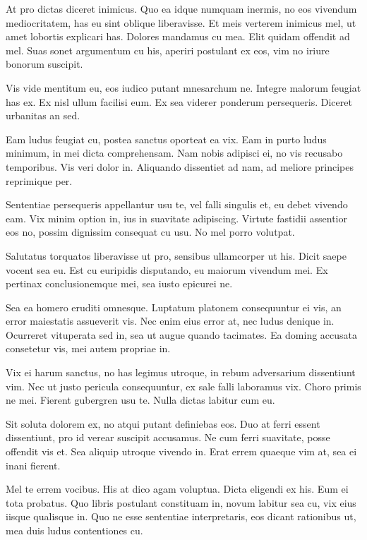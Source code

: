 \documentclass[twocolumn,twoside]{IEEEtran}
\begin{document}
 At pro dictas diceret inimicus. Quo ea idque numquam inermis, no eos vivendum
 mediocritatem, has eu sint oblique liberavisse. Et meis verterem inimicus mel,
 ut amet lobortis explicari has. Dolores mandamus cu mea. Elit quidam offendit
 ad mel. Suas sonet argumentum cu his, aperiri postulant ex eos, vim no iriure
 bonorum suscipit.

 Vis vide mentitum eu, eos iudico putant mnesarchum ne. Integre malorum feugiat
 has ex. Ex nisl ullum facilisi eum. Ex sea viderer ponderum persequeris.
 Diceret urbanitas an sed.

 Eam ludus feugiat cu, postea sanctus oporteat ea vix. Eam in purto ludus
 minimum, in mei dicta comprehensam. Nam nobis adipisci ei, no vis recusabo
 temporibus. Vis veri dolor in. Aliquando dissentiet ad nam, ad meliore
 principes reprimique per.

 Sententiae persequeris appellantur usu te, vel falli singulis et, eu debet
 vivendo eam. Vix minim option in, ius in suavitate adipiscing. Virtute
 fastidii assentior eos no, possim dignissim consequat cu usu. No mel porro
 volutpat.

 Salutatus torquatos liberavisse ut pro, sensibus ullamcorper ut his. Dicit
 saepe vocent sea eu. Est cu euripidis disputando, eu maiorum vivendum mei. Ex
 pertinax conclusionemque mei, sea iusto epicurei ne.

 Sea ea homero eruditi omnesque. Luptatum platonem consequuntur ei vis, an
 error maiestatis assueverit vis. Nec enim eius error at, nec ludus denique in.
 Ocurreret vituperata sed in, sea ut augue quando tacimates. Ea doming accusata
 consetetur vis, mei autem propriae in.

 Vix ei harum sanctus, no has legimus utroque, in rebum adversarium dissentiunt
 vim. Nec ut justo pericula consequuntur, ex sale falli laboramus vix. Choro
 primis ne mei. Fierent gubergren usu te. Nulla dictas labitur cum eu.

 Sit soluta dolorem ex, no atqui putant definiebas eos. Duo at ferri essent
 dissentiunt, pro id verear suscipit accusamus. Ne cum ferri suavitate, posse
 offendit vis et. Sea aliquip utroque vivendo in. Erat errem quaeque vim at,
 sea ei inani fierent.

 Mel te errem vocibus. His at dico agam voluptua. Dicta eligendi ex his. Eum ei
 tota probatus. Quo libris postulant constituam in, novum labitur sea cu, vix
 eius iisque qualisque in. Quo ne esse sententiae interpretaris, eos dicant
 rationibus ut, mea duis ludus contentiones cu.
\end{document}
